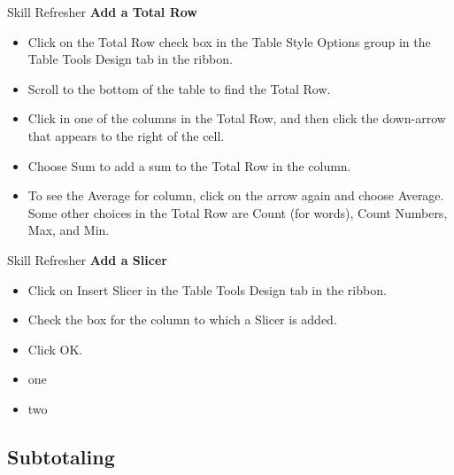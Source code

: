 \begin{center}
	\begin{sklbox}{Skill Refresher}
		\textbf{Add a Total Row}
		\\
		\begin{itemize}
			\setlength{\itemsep}{0pt}
			\setlength{\parskip}{0pt}
			\setlength{\parsep}{0pt}

			\item Click on the Total Row check box in the Table Style Options group in the Table Tools Design tab in the ribbon.
			\item Scroll to the bottom of the table to find the Total Row.
			\item Click in one of the columns in the Total Row, and then click the down-arrow that appears to the right of the cell.
			\item Choose Sum to add a sum to the Total Row in the column.
			\item To see the Average for column, click on the arrow again and choose Average. Some other choices in the Total Row are Count (for words), Count Numbers, Max, and Min.
			
		\end{itemize}
	\end{sklbox}
\end{center}

\begin{center}
	\begin{sklbox}{Skill Refresher}
		\textbf{Add a Slicer}
		\\
		\begin{itemize}
			\setlength{\itemsep}{0pt}
			\setlength{\parskip}{0pt}
			\setlength{\parsep}{0pt}

			\item Click on Insert Slicer in the Table Tools Design tab in the ribbon.
			\item Check the box for the column to which a Slicer is added.
			\item Click OK.
			
			\item one
			\item two
			
		\end{itemize}
	\end{sklbox}
\end{center}




\subsection{Subtotaling}

